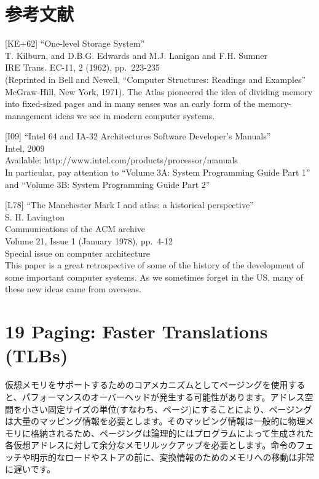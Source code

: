 \hypertarget{ux53c2ux8003ux6587ux732e-10}{%
\section*{参考文献}\label{ux53c2ux8003ux6587ux732e-10}}

{[}KE+62{]} ``One-level Storage System''\\
T. Kilburn, and D.B.G. Edwards and M.J. Lanigan and F.H. Sumner\\
IRE Trans. EC-11, 2 (1962), pp.~223-235\\
(Reprinted in Bell and Newell, ``Computer Structures: Readings and
Examples'' McGraw-Hill, New York, 1971). The Atlas pioneered the idea of
dividing memory into fixed-sized pages and in many senses was an early
form of the memory-management ideas we see in modern computer systems.

{[}I09{]} ``Intel 64 and IA-32 Architectures Software Developer's
Manuals''\\
Intel, 2009\\
Available: http://www.intel.com/products/processor/manuals\\
In particular, pay attention to ``Volume 3A: System Programming Guide
Part 1'' and ``Volume 3B: System Programming Guide Part 2''

{[}L78{]} ``The Manchester Mark I and atlas: a historical
perspective''\\
S. H. Lavington\\
Communications of the ACM archive\\
Volume 21, Issue 1 (January 1978), pp.~4-12\\
Special issue on computer architecture\\
This paper is a great retrospective of some of the history of the
development of some important computer systems. As we sometimes forget
in the US, many of these new ideas came from overseas.

\newpage

\hypertarget{paging-faster-translations-tlbs}{%
\section*{19 Paging: Faster Translations
(TLBs)}\label{paging-faster-translations-tlbs}}

仮想メモリをサポートするためのコアメカニズムとしてページングを使用すると、パフォーマンスのオーバーヘッドが発生する可能性があります。アドレス空間を小さい固定サイズの単位(すなわち、ページ)にすることにより、ページングは大量のマッピング情報を必要とします。そのマッピング情報は一般的に物理メモリに格納されるため、ページングは論理的にはプログラムによって生成された各仮想アドレスに対して余分なメモリルックアップを必要とします。命令のフェッチや明示的なロードやストアの前に、変換情報のためのメモリへの移動は非常に遅いです。

